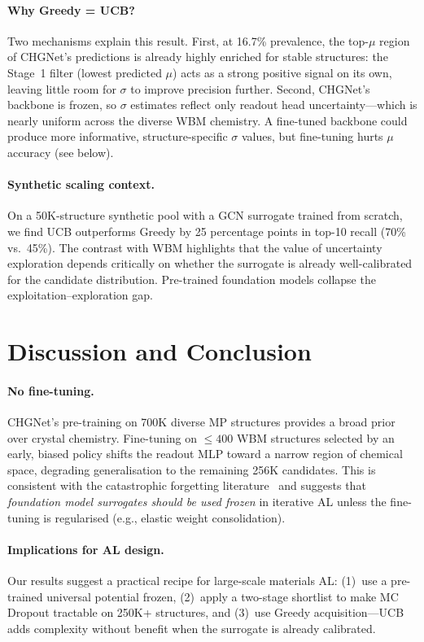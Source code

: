 \documentclass{article}
\begin{document}
\paragraph{Why Greedy = UCB?}
Two mechanisms explain this result.
First, at 16.7\% prevalence, the top-$\mu$ region of CHGNet's predictions is
already highly enriched for stable structures: the Stage~1 filter (lowest
predicted $\mu$) acts as a strong positive signal on its own, leaving little
room for $\sigma$ to improve precision further.
Second, CHGNet's backbone is frozen, so $\sigma$ estimates reflect only readout
head uncertainty---which is nearly uniform across the diverse WBM chemistry.
A fine-tuned backbone could produce more informative, structure-specific $\sigma$
values, but fine-tuning hurts $\mu$ accuracy (see below).

\paragraph{Synthetic scaling context.}
On a 50K-structure synthetic pool with a GCN surrogate trained from scratch, we
find UCB outperforms Greedy by 25 percentage points in top-10 recall (70\% vs.\
45\%).  The contrast with WBM highlights that the value of uncertainty
exploration depends critically on whether the surrogate is already well-calibrated
for the candidate distribution.  Pre-trained foundation models collapse the
exploitation--exploration gap.

\section{Discussion and Conclusion}

\paragraph{No fine-tuning.}
CHGNet's pre-training on 700K diverse MP structures provides a broad prior over
crystal chemistry.  Fine-tuning on $\le 400$ WBM structures selected by an early,
biased policy shifts the readout MLP toward a narrow region of chemical space,
degrading generalisation to the remaining 256K candidates.
This is consistent with the catastrophic forgetting literature~\cite{goodfellow2013empirical}
and suggests that \emph{foundation model surrogates should be used frozen} in
iterative AL unless the fine-tuning is regularised (e.g., elastic weight
consolidation).

\paragraph{Implications for AL design.}
Our results suggest a practical recipe for large-scale materials AL: (1)~use a
pre-trained universal potential frozen, (2)~apply a two-stage shortlist to make
MC Dropout tractable on 250K+ structures, and (3)~use Greedy acquisition---UCB
adds complexity without benefit when the surrogate is already calibrated.
\end{document}
